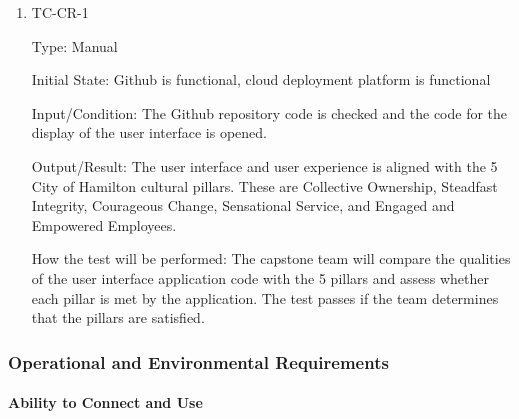 \documentclass[12pt, titlepage]{article}
\begin{document}
\begin{enumerate}
  \item{TC-CR-1\\}

    Type: Manual

    Initial State: Github is functional, cloud deployment platform is functional

    Input/Condition: The Github repository code is checked and the code for the
    display of the user interface is opened.

    Output/Result: The user interface and user experience is aligned with the 5
    City of Hamilton cultural pillars. These are Collective Ownership,
    Steadfast Integrity, Courageous Change, Sensational Service, and
    Engaged and Empowered Employees.

    How the test will be performed: The capstone team will compare the qualities
    of the user interface application code with the 5 pillars and assess whether
    each pillar is met by the application. The test passes if the
    team determines
    that the pillars are satisfied.
\end{enumerate}

\subsubsection{Operational and Environmental Requirements}

\paragraph{Ability to Connect and Use}
\end{document}
